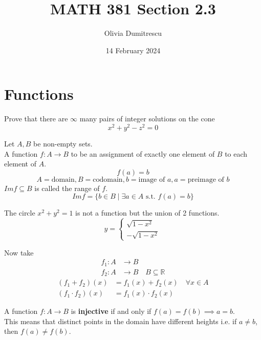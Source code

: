 \documentclass[letterpaper, 12pt]{article}
\title{MATH 381 Section 2.3}
\author{Olivia Dumitrescu}
\date{14 February 2024}
\newenvironment{definition}[1][Definition]{\begin{trivlist}
\item[\hskip \labelsep {\bfseries #1}]}{\end{trivlist}}
\newenvironment{example}[1][Example]{\begin{trivlist}
\item[\hskip \labelsep {\bfseries #1}]}{\end{trivlist}}
\newcommand{\keyword}[1]{\textbf{#1}}
\begin{document}
    \maketitle
    \section*{Functions}
    \begin{example}
        Prove that there are $\infty$  many pairs of integer solutions on the cone 
        \[x^2 + y^2 - z^2 = 0\]
    \end{example}
    \begin{definition}
        Let $A, B$ be non-empty sets. \\
        A function $f: A \rightarrow B$ to be an assignment of exactly one element of $B$ to 
        each element of $A$.
        \[f(a) = b\]
        \[A = \text{domain}, B = \text{codomain}, 
        b = \text{image of $a$}, a = \text{preimage of $b$}\]
        $Im f \subseteq B$ is called the range of $f$.
        \[Im f = \{b \in B \mid \exists a \in A \text{ s.t. } f(a) = b\}\]
    \end{definition}
    \begin{example}
        The circle $x^2 + y^2 = 1$ is not a function but the union of 2 functions.
        \[y = \begin{cases}
            \sqrt{1 - x^2} \\
            -\sqrt{1 - x^2}
        \end{cases}\]
    \end{example}
    \begin{example}
        Now take
        \begin{align*}
            f_1 : A &\rightarrow B \\
            f_2 : A &\rightarrow B \quad B \subseteq \mathbb{R}
        \end{align*}
        \begin{align*}
            (f_1 + f_2)(x) &= f_1(x) + f_2(x) \quad \forall x \in A \\
            (f_1 \cdot f_2)(x) &= f_1(x) \cdot f_2(x)
        \end{align*}
    \end{example}
    \begin{definition}
        A function $f: A \rightarrow B$ is \keyword{injective} if and only if 
        $f(a) = f(b) \implies a = b$. \\
        This means that distinct points in the domain have different heights 
        i.e. if $a \ne b$, then $f(a) \ne f(b)$.
    \end{definition}
\end{document}
